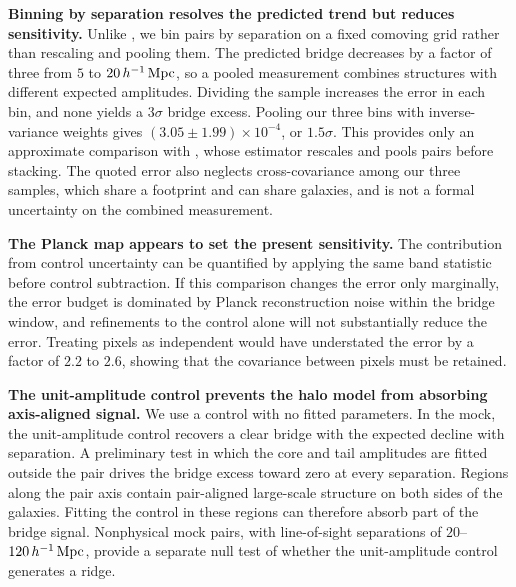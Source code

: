 \textbf{Binning by separation resolves the predicted trend but reduces
sensitivity.} Unlike \citet{deGraaff2019}, we bin pairs by separation on a
fixed comoving grid rather than rescaling and pooling them. The predicted
bridge decreases by a factor of three from $5$ to $20\,h^{-1}\,{\rm Mpc}$, so a pooled
measurement combines structures with different expected amplitudes. Dividing
the sample increases the error in each bin, and none yields a $3\sigma$
bridge excess. Pooling our three bins with inverse-variance weights gives
$\left(3.05\pm1.99\right)\times10^{-4}$, or $1.5\sigma$. This provides only an
approximate comparison with \citet{deGraaff2019}, whose estimator rescales and
pools pairs before stacking. The quoted error also neglects cross-covariance among our
three samples, which share a footprint and can share galaxies, and is not a
formal uncertainty on the combined measurement.

\textbf{The Planck map appears to set the present sensitivity.} The
contribution from control uncertainty can be quantified by applying the same
band statistic before control subtraction.
If this comparison changes the error only marginally, the error budget is
dominated by Planck reconstruction noise within the bridge window, and
refinements to the control alone will not substantially reduce the error.
Treating pixels as independent would have understated
the error by a factor of $2.2$ to $2.6$, %
showing that the covariance between pixels must be retained.

\textbf{The unit-amplitude control prevents the halo model from absorbing
axis-aligned signal.}
We use a control with no fitted parameters. In the mock, the unit-amplitude
control recovers a clear bridge with the expected decline with separation. A
preliminary test in which the core and tail amplitudes are fitted outside the
pair drives the bridge excess toward zero at every separation.
Regions along the pair axis contain pair-aligned large-scale structure on both
sides of the galaxies. Fitting the control in these regions can therefore
absorb part of the bridge signal. Nonphysical mock pairs, with
line-of-sight separations of
$20$--$120\,h^{-1}\,{\rm Mpc}$, provide a separate null test of whether the
unit-amplitude control generates a ridge. %

